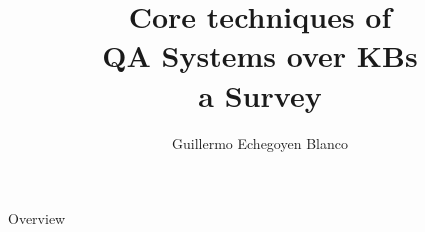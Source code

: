 \documentclass{beamer}
\title{Core techniques of \\ \textbf{QA Systems over KBs \\ a Survey}}
\author{Guillermo Echegoyen Blanco}
\date{}
\begin{document}
\maketitle

\note{}


\begin{frame}{Overview}
  \begin{card}
    \tableofcontents
  \end{card}
\end{frame}

\note{}

\end{document}
